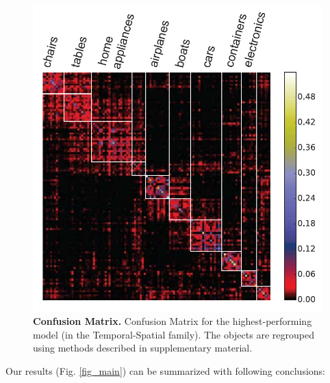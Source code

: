 \begin{figure}[h]
\FigCenter
\includegraphics [width=\SmallFigSize\linewidth]{figures/confusion.pdf}
\vspace{-3mm}
\caption{\footnotesize{\textbf{Confusion Matrix.} Confusion Matrix for the highest-performing model (in the Temporal-Spatial family). The objects are regrouped using methods described in supplementary material.}~\label{fig_confusion}}
\vspace{-5mm}
\end{figure}


Our results (Fig. \ref{fig_main}) can be summarized with following conclusions:

